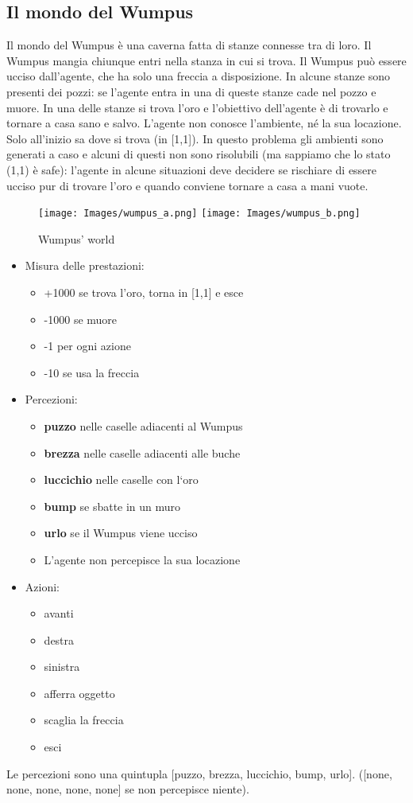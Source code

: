 \documentclass{article}
\begin{document}
\subsection{Il mondo del Wumpus}
Il mondo del Wumpus è una caverna fatta di stanze connesse tra di loro. Il Wumpus mangia chiunque entri nella stanza in cui si trova. Il Wumpus può essere ucciso dall’agente, che ha solo una freccia a disposizione. In alcune stanze sono presenti dei pozzi: se l'agente entra in una di queste stanze cade nel pozzo e muore. In una delle stanze si trova l’oro e l’obiettivo dell'agente è di trovarlo e tornare a casa sano e salvo. L’agente non conosce l’ambiente, né la sua locazione. Solo all'inizio sa dove si trova (in [1,1]). In questo problema gli ambienti sono generati a caso e alcuni di questi non sono risolubili (ma sappiamo che lo stato (1,1) è safe): l’agente in alcune situazioni deve decidere se rischiare di essere ucciso pur di trovare l’oro e quando conviene tornare a casa a mani vuote.
\begin{figure}[H]
\centering
\texttt{[image: Images/wumpus\_a.png]}
\texttt{[image: Images/wumpus\_b.png]}
\caption{Wumpus' world}
\end{figure}
\begin{itemize}
    \item Misura delle prestazioni:
    \begin{itemize}
        \item +1000 se trova l’oro, torna in [1,1] e esce
        \item -1000 se muore
        \item -1 per ogni azione
        \item -10 se usa la freccia
    \end{itemize}
    \item Percezioni:
    \begin{itemize}
        \item \textbf{puzzo} nelle caselle adiacenti al Wumpus
        \item \textbf{brezza} nelle caselle adiacenti alle buche
        \item \textbf{luccichio} nelle caselle con l‘oro
        \item \textbf{bump} se sbatte in un muro
        \item \textbf{urlo} se il Wumpus viene ucciso
        \item L’agente non percepisce la sua locazione
    \end{itemize}
    \item Azioni:
    \begin{itemize}
        \item avanti
        \item destra
        \item sinistra
        \item afferra oggetto
        \item scaglia la freccia
        \item esci
    \end{itemize}
\end{itemize}
Le percezioni sono una quintupla [puzzo, brezza, luccichio, bump, urlo]. ([none, none, none, none, none] se non percepisce niente).
\end{document}
